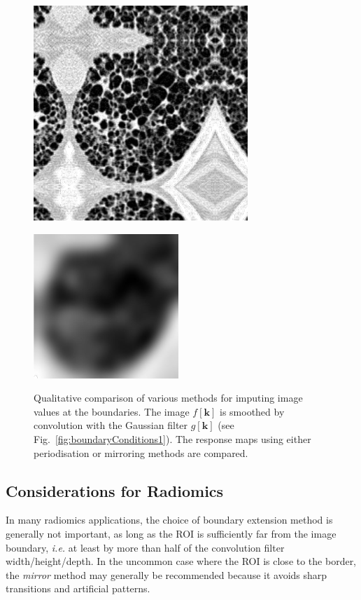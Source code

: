 \documentclass[fleqn,a4paper,oneside,openany]{book}
\begin{document}
\begin{figure}
\begin{minipage}[b]{150pt}
     \hspace{100pt}
   \end{minipage}
   \begin{minipage}[b]{150pt}
     \centering
     \includegraphics[trim = 0 0 0 0, clip, scale=0.57]{MirrorFext_BC.png}
     \label{fig:boundaryConditions2_c}
   \end{minipage}
   \begin{minipage}[b]{150pt}
     \centering
     \includegraphics[trim = 0 -34 0 0, clip, scale=0.57]{MirrorC_BC.png}
     \label{fig:boundaryConditions2_d}
   \end{minipage}
  \caption{Qualitative comparison of various methods for imputing image values at the boundaries.  The image $f[\boldsymbol{k}]$ is smoothed by convolution with the Gaussian filter $g[\boldsymbol{k}]$ (see Fig.~\ref{fig:boundaryConditions1}).
  The response maps using either periodisation or mirroring methods are compared.}
  \label{fig:boundaryConditions2}
\end{figure}

\subsection{Considerations for Radiomics}
%
In many radiomics applications, the choice of boundary extension method is generally not important, as long as the ROI is sufficiently far from the image boundary, \textit{i.e.} at least by more than half of the convolution filter width/height/depth. In the uncommon case where the ROI is close to the border, the \textit{mirror} method may generally be recommended because it avoids sharp transitions and artificial patterns.
\end{document}
